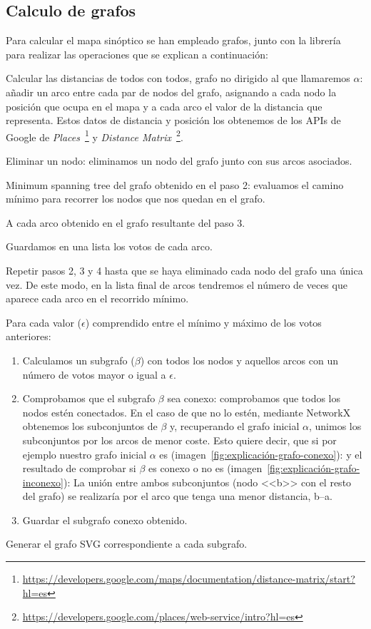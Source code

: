 \subsection{Calculo de grafos}\label{sub:grafos-aspectos-relevantes}
Para calcular el mapa sinóptico se han empleado grafos, junto con la librería~ para realizar las operaciones que se explican a continuación:

\begin{steps}
	\item Calcular las distancias de todos con todos, grafo no dirigido al que llamaremos $\alpha$: añadir un arco entre cada par de nodos del grafo, asignando a cada nodo la posición que ocupa en el mapa y a cada arco el valor de la distancia que representa. Estos datos de distancia y posición los obtenemos de los APIs de Google de \textit{Places}~\footnote{\url{https://developers.google.com/maps/documentation/distance-matrix/start?hl=es}} y \textit{Distance Matrix}~\footnote{\url{https://developers.google.com/places/web-service/intro?hl=es}}.
	\item Eliminar un nodo: eliminamos un nodo del grafo junto con sus arcos asociados.
	\item Minimum spanning tree del grafo obtenido en el paso 2: evaluamos el camino mínimo para recorrer los nodos que nos quedan en el grafo.
	\item A cada arco obtenido en el grafo resultante del paso 3.
	\item Guardamos en una lista los votos de cada arco.
	\item Repetir pasos 2, 3 y 4 hasta que se haya eliminado cada nodo del grafo una única vez. De este modo, en la lista final de arcos tendremos el número de veces que aparece cada arco en el recorrido mínimo.
	\item Para cada valor ($\epsilon$) comprendido entre el mínimo y máximo de los votos anteriores:
	\begin{enumerate}
		\item Calculamos un subgrafo ($\beta$) con todos los nodos y aquellos arcos con un número de votos mayor o igual a $\epsilon$.
		\item Comprobamos que el subgrafo $\beta$ sea conexo: comprobamos que todos los nodos estén conectados. En el caso de que no lo estén, mediante NetworkX obtenemos los subconjuntos de $\beta$ y, recuperando el grafo inicial $\alpha$, unimos los subconjuntos por los arcos de menor coste. Esto quiere decir, que si por ejemplo nuestro grafo inicial $\alpha$ es (imagen~\ref{fig:explicación-grafo-conexo}):
		y el resultado de comprobar si $\beta$ es conexo o no es (imagen~\ref{fig:explicación-grafo-inconexo}):
		La unión entre ambos subconjuntos (nodo <<b>> con el resto del grafo) se realizaría por el arco que tenga una menor distancia, b--a.
		\item Guardar el subgrafo conexo obtenido.
	\end{enumerate}
	\item Generar el grafo SVG correspondiente a cada subgrafo.
\end{steps}



